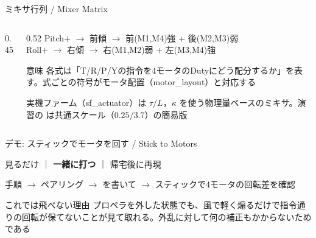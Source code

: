 \begin{frame}{ミキサ行列 / Mixer Matrix}
  \begin{columns}[T]
    \begin{column}{0.45\textwidth}
      \centering
      \resizebox{0.95\columnwidth}{!}{}
    \end{column}
    \begin{column}{0.52\textwidth}
      \vspace{0.5em}
      {\footnotesize
      Pitch+ $\to$ 前傾 $\to$ 前(M1,M4)強 + 後(M2,M3)弱\\[3pt]
      Roll+ $\to$ 右傾 $\to$ 右(M1,M2)弱 + 左(M3,M4)強}
      \vspace{0.5em}
      \begin{exampleblock}{意味}\footnotesize
        各式は「T/R/P/Yの指令を4モータのDutyにどう配分するか」を表す。式ごとの符号がモータ配置（motor\_layout）と対応する
      \end{exampleblock}
      \vspace{0.3em}
      {\footnotesize 実機ファーム（sf\_actuator）は $\tau/L$，$\kappa$ を使う物理量ベースのミキサ。演習の  は共通スケール（$0.25/3.7$）の簡易版}
    \end{column}
  \end{columns}
\end{frame}

\begin{frame}[fragile]{デモ: スティックでモータを回す / Stick to Motors}
  \vspace{0.3em}

  {\small 見るだけ ｜ \textcolor{sfblue}{\textbf{一緒に打つ}} ｜ 帰宅後に再現}

  \vspace{0.5em}

  \begin{block}{手順}\footnotesize
     $\to$ ペアリング $\to$  を書いて  $\to$ スティックで4モータの回転差を確認
  \end{block}

  \vspace{0.3em}

  \begin{alertblock}{これでは飛べない理由}
    \small プロペラを外した状態でも、風で軽く煽るだけで指令通りの回転が保てないことが見て取れる。外乱に対して何の補正もかからないためである
  \end{alertblock}
\end{frame}

